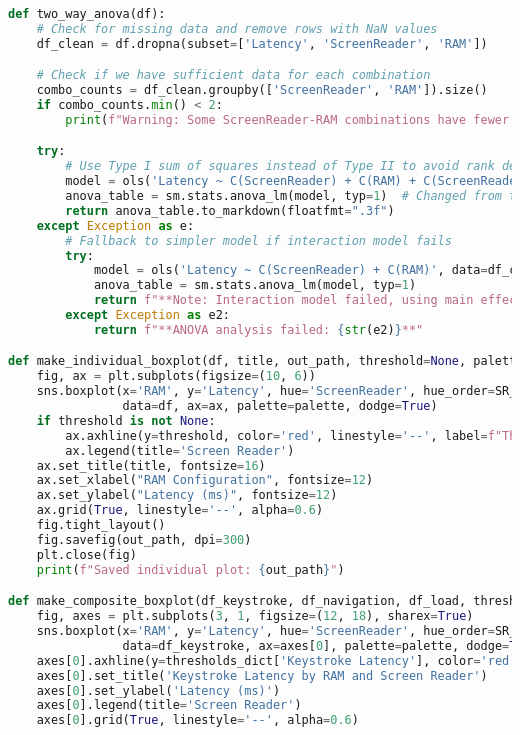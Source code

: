 \begin{lstlisting}[language=Python]
def two_way_anova(df):
    # Check for missing data and remove rows with NaN values
    df_clean = df.dropna(subset=['Latency', 'ScreenReader', 'RAM'])

    # Check if we have sufficient data for each combination
    combo_counts = df_clean.groupby(['ScreenReader', 'RAM']).size()
    if combo_counts.min() < 2:
        print(f"Warning: Some ScreenReader-RAM combinations have fewer than 2 observations")

    try:
        # Use Type I sum of squares instead of Type II to avoid rank deficiency issues
        model = ols('Latency ~ C(ScreenReader) + C(RAM) + C(ScreenReader):C(RAM)', data=df_clean).fit()
        anova_table = sm.stats.anova_lm(model, typ=1)  # Changed from typ=2 to typ=1
        return anova_table.to_markdown(floatfmt=".3f")
    except Exception as e:
        # Fallback to simpler model if interaction model fails
        try:
            model = ols('Latency ~ C(ScreenReader) + C(RAM)', data=df_clean).fit()
            anova_table = sm.stats.anova_lm(model, typ=1)
            return f"**Note: Interaction model failed, using main effects only**\n\n{anova_table.to_markdown(floatfmt='.3f')}"
        except Exception as e2:
            return f"**ANOVA analysis failed: {str(e2)}**"

def make_individual_boxplot(df, title, out_path, threshold=None, palette=None):
    fig, ax = plt.subplots(figsize=(10, 6))
    sns.boxplot(x='RAM', y='Latency', hue='ScreenReader', hue_order=SR_ORDER,
                data=df, ax=ax, palette=palette, dodge=True)
    if threshold is not None:
        ax.axhline(y=threshold, color='red', linestyle='--', label=f"Threshold ({threshold}ms)")
        ax.legend(title='Screen Reader')
    ax.set_title(title, fontsize=16)
    ax.set_xlabel("RAM Configuration", fontsize=12)
    ax.set_ylabel("Latency (ms)", fontsize=12)
    ax.grid(True, linestyle='--', alpha=0.6)
    fig.tight_layout()
    fig.savefig(out_path, dpi=300)
    plt.close(fig)
    print(f"Saved individual plot: {out_path}")

def make_composite_boxplot(df_keystroke, df_navigation, df_load, thresholds_dict, out_path, palette=None):
    fig, axes = plt.subplots(3, 1, figsize=(12, 18), sharex=True)
    sns.boxplot(x='RAM', y='Latency', hue='ScreenReader', hue_order=SR_ORDER,
                data=df_keystroke, ax=axes[0], palette=palette, dodge=True)
    axes[0].axhline(y=thresholds_dict['Keystroke Latency'], color='red', linestyle='--')
    axes[0].set_title('Keystroke Latency by RAM and Screen Reader')
    axes[0].set_ylabel('Latency (ms)')
    axes[0].legend(title='Screen Reader')
    axes[0].grid(True, linestyle='--', alpha=0.6)


\end{lstlisting}
